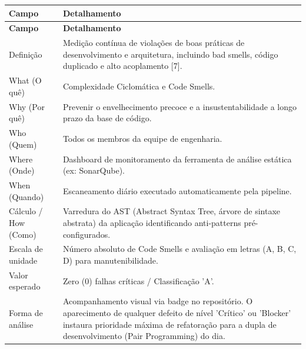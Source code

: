 \begingroup
\small
\setlength{\tabcolsep}{4pt}
\renewcommand{\arraystretch}{1.2}
\begin{longtable}{|>{\raggedright\arraybackslash}p{}|>{\raggedright\arraybackslash}p{}|}
\hline
\textbf{Campo} & \textbf{Detalhamento} \\ \hline
\endfirsthead
\textbf{Campo} & \textbf{Detalhamento} \\ \hline
\endhead
Definição & Medição contínua de violações de boas práticas de desenvolvimento e arquitetura, incluindo bad smells, código duplicado e alto acoplamento [7]. \\ \hline
What (O quê) & Complexidade Ciclomática e Code Smells. \\ \hline
Why (Por quê) & Prevenir o envelhecimento precoce e a insustentabilidade a longo prazo da base de código. \\ \hline
Who (Quem) & Todos os membros da equipe de engenharia. \\ \hline
Where (Onde) & Dashboard de monitoramento da ferramenta de análise estática (ex: SonarQube). \\ \hline
When (Quando) & Escaneamento diário executado automaticamente pela pipeline. \\ \hline
Cálculo / How (Como) & Varredura do AST (Abstract Syntax Tree, árvore de sintaxe abstrata) da aplicação identificando anti-patterns pré-configurados. \\ \hline
Escala de unidade & Número absoluto de Code Smells e avaliação em letras (A, B, C, D) para manutenibilidade. \\ \hline
Valor esperado & Zero (0) falhas críticas / Classificação 'A'. \\ \hline
Forma de análise & Acompanhamento visual via badge no repositório. O aparecimento de qualquer defeito de nível 'Crítico' ou 'Blocker' instaura prioridade máxima de refatoração para a dupla de desenvolvimento (Pair Programming) do dia. \\ \hline
\end{longtable}
\endgroup

